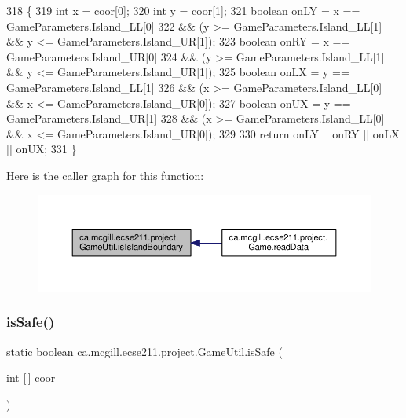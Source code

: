 \begin{DoxyCode}
318                                                      \{
319     \textcolor{keywordtype}{int} x = coor[0];
320     \textcolor{keywordtype}{int} y = coor[1];
321     \textcolor{keywordtype}{boolean} onLY = x == GameParameters.Island\_LL[0]
322         && (y >= GameParameters.Island\_LL[1] && y <= GameParameters.Island\_UR[1]);
323     \textcolor{keywordtype}{boolean} onRY = x == GameParameters.Island\_UR[0]
324         && (y >= GameParameters.Island\_LL[1] && y <= GameParameters.Island\_UR[1]);
325     \textcolor{keywordtype}{boolean} onLX = y == GameParameters.Island\_LL[1]
326         && (x >= GameParameters.Island\_LL[0] && x <= GameParameters.Island\_UR[0]);
327     \textcolor{keywordtype}{boolean} onUX = y == GameParameters.Island\_UR[1]
328         && (x >= GameParameters.Island\_LL[0] && x <= GameParameters.Island\_UR[0]);
329 
330     \textcolor{keywordflow}{return} onLY || onRY || onLX || onUX;
331   \}
\end{DoxyCode}
Here is the caller graph for this function\+:
\nopagebreak
\begin{figure}[H]
\begin{center}
\leavevmode
\includegraphics[width=350pt]{classca_1_1mcgill_1_1ecse211_1_1project_1_1_game_util_a5783c3415e13b66362a647504b63741a_icgraph}
\end{center}
\end{figure}
\mbox{\label{classca_1_1mcgill_1_1ecse211_1_1project_1_1_game_util_a4b657445545fb1a814b6699724d72042}} 
\subsubsection{\texorpdfstring{is\+Safe()}{isSafe()}}
{\footnotesize\ttfamily static boolean ca.\+mcgill.\+ecse211.\+project.\+Game\+Util.\+is\+Safe (\begin{DoxyParamCaption}\item[{int \mbox{[}$\,$\mbox{]}}]{coor }\end{DoxyParamCaption})\hspace{0.3cm}{\ttfamily [static]}}

